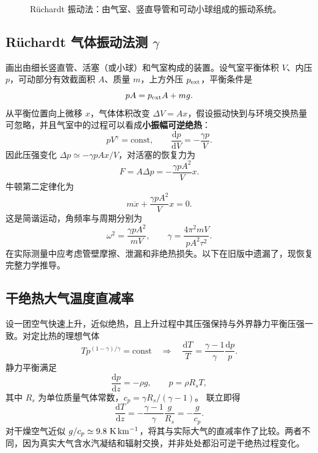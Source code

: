 \documentclass[11pt,a4paper,openany]{ctexbook}
\newcommand{\dd}{\mathrm d}
\newcommand{\const}{\mathrm{const}}
\begin{document}
\begin{figure}[htbp]\centering
{}
\caption{Rüchardt 振动法：由气室、竖直导管和可动小球组成的振动系统。}
\end{figure}

\subsection*{Rüchardt 气体振动法测 $\gamma$}
画出由细长竖直管、活塞（或小球）和气室构成的装置。设气室平衡体积 $V$、内压 $p$，可动部分有效截面积 $A$、质量 $m$，上方外压 $p_{\rm ext}$，平衡条件是
\[
pA=p_{\rm ext}A+mg.
\]
从平衡位置向上微移 $x$，气体体积改变 $\Delta V=Ax$，假设振动快到与环境交换热量可忽略，并且气室中的过程可以看成\textbf{小振幅可逆绝热}：
\[
pV^\gamma=\const,\qquad
\frac{\dd p}{\dd V}=-\frac{\gamma p}{V}.
\]
因此压强变化 $\Delta p\simeq-\gamma p Ax/V$，对活塞的恢复力为
\[
F=A\Delta p=-\frac{\gamma pA^2}{V}x.
\]
牛顿第二定律化为
\[
m\ddot x+\frac{\gamma pA^2}{V}x=0.
\]
这是简谐运动，角频率与周期分别为
\[
\omega^2=\frac{\gamma pA^2}{mV},\qquad
\boxed{\gamma=\frac{4\pi^2mV}{pA^2\tau^2}}.
\]
在实际测量中应考虑管壁摩擦、泄漏和非绝热损失。以下在旧版中遗漏了，现恢复完整力学推导。

\subsection*{干绝热大气温度直减率}
设一团空气快速上升，近似绝热，且上升过程中其压强保持与外界静力平衡压强一致。对定比热的理想气体
\[
T p^{(1-\gamma)/\gamma}=\const
\quad\Longrightarrow\quad
\frac{\dd T}{T}=\frac{\gamma-1}{\gamma}\frac{\dd p}{p}.
\]
静力平衡满足
\[
\frac{\dd p}{\dd z}=-\rho g,\qquad
p=\rho R_sT,
\]
其中 $R_s$ 为单位质量气体常数，$c_p=\gamma R_s/(\gamma-1)$。
联立即得
\[
\boxed{\frac{\dd T}{\dd z}
=-\frac{\gamma-1}{\gamma}\frac g{R_s}
=-\frac g{c_p}.}
\]
对干燥空气近似 $g/c_p\simeq9.8\ {\rm K\,km^{-1}}$，将其与实际大气的直减率作了比较。两者不同，因为真实大气含水汽凝结和辐射交换，并非处处都沿可逆干绝热过程变化。
\end{document}
